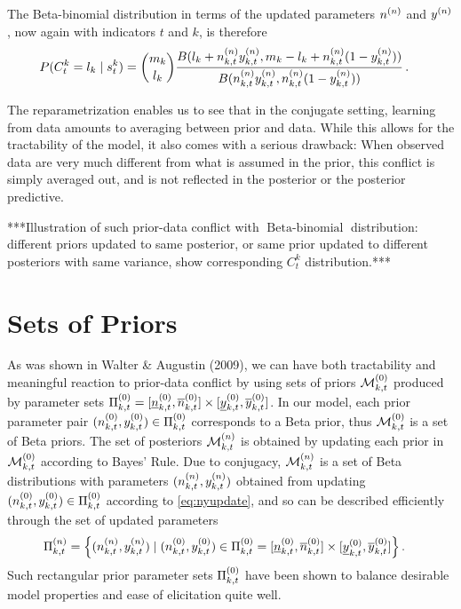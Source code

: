 \documentclass[authoryear, 12pt, a4paper]{elsarticle}
\newcommand{\bebin}{\operatorname{Beta-binomial}}
\begin{document}
The Beta-binomial distribution in terms of the updated parameters $n^{(n)}$ and $y^{(n)}$,
now again with indicators $t$ and $k$,
is therefore
\begin{align*}
P(C^k_t = l_k \mid s^k_t) &= {m_k \choose l_k} \frac{B(l_k + n^{(n)}_{k,t}y^{(n)}_{k,t}, m_k - l_k + n^{(n)}_{k,t}(1-y^{(n)}_{k,t}))}
                                                    {B(n^{(n)}_{k,t}y^{(n)}_{k,t}, n^{(n)}_{k,t}(1-y^{(n)}_{k,t}))} \,.
\end{align*}

The reparametrization enables us to see that in the conjugate setting,
learning from data amounts to averaging between prior and data.
While this allows for the tractability of the model,
it also comes with a serious drawback:
When observed data are very much different from what is assumed in the prior,
this conflict is simply averaged out,
and is not reflected in the posterior or the posterior predictive.
 
***Illustration of such prior-data conflict with $\bebin$ distribution:
different priors updated to same posterior,
or same prior updated to different posteriors with same variance,
show corresponding $C^k_t$ distribution.***



\section{Sets of Priors}

As was shown in Walter \& Augustin (2009),
we can have both tractability and meaningful reaction to prior-data conflict
by using sets of priors $\mathcal{M}^{(0)}_{k,t}$ produced by parameter sets $\Pi^{(0)}_{k,t} = [\underline{n}^{(0)}_{k,t}, \overline{n}^{(0)}_{k,t}] \times [\underline{y}^{(0)}_{k,t}, \overline{y}^{(0)}_{k,t}]$. 
In our model, each prior parameter pair $(n^{(0)}_{k,t}, y^{(0)}_{k,t}) \in \Pi^{(0)}_{k,t}$
corresponds to a Beta prior, thus $\mathcal{M}^{(0)}_{k,t}$ is a set of Beta priors.
The set of posteriors $\mathcal{M}^{(n)}_{k,t}$ is obtained by updating each prior in $\mathcal{M}^{(0)}_{k,t}$ according to Bayes' Rule.
Due to conjugacy, $\mathcal{M}^{(n)}_{k,t}$ is a set of Beta distributions with parameters $(n^{(n)}_{k,t}, y^{(n)}_{k,t})$
obtained from updating $(n^{(0)}_{k,t}, y^{(0)}_{k,t}) \in \Pi^{(0)}_{k,t}$ according to \eqref{eq:nyupdate},
and so can be described efficiently through the set of updated parameters
\begin{align*}
\Pi^{(n)}_{k,t} &= \Big\{ (n^{(n)}_{k,t}, y^{(n)}_{k,t}) \mid (n^{(0)}_{k,t}, y^{(0)}_{k,t}) \in \Pi^{(0)}_{k,t} = [\underline{n}^{(0)}_{k,t}, \overline{n}^{(0)}_{k,t}] \times [\underline{y}^{(0)}_{k,t}, \overline{y}^{(0)}_{k,t}] \Big\}\,.
\end{align*}
Such rectangular prior parameter sets $\Pi^{(0)}_{k,t}$ have been shown
to balance desirable model properties and ease of elicitation quite well.
\end{document}
